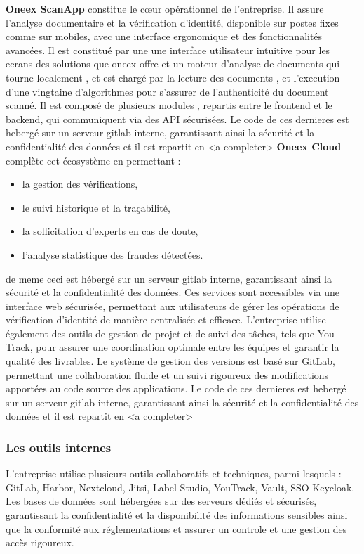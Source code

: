 \textbf{Oneex ScanApp} constitue le cœur opérationnel de l’entreprise. Il assure l’analyse documentaire et la vérification d’identité, disponible sur postes fixes comme sur mobiles, avec une interface ergonomique et des fonctionnalités avancées. Il est constitué par une une interface utilisateur intuitive pour les ecrans des solutions que oneex offre et un moteur d’analyse de documents qui tourne localement , et est chargé par la lecture des documents , et l'execution d'une vingtaine d'algorithmes pour s'assurer de l'authenticité du document scanné.
Il est composé de plusieurs modules , repartis entre le frontend et le backend, qui communiquent via des API sécurisées.
Le code de ces dernieres est hebergé sur un serveur gitlab interne, garantissant ainsi la sécurité et la confidentialité des données et il est repartit en
<a completer>
\textbf{Oneex Cloud} complète cet écosystème en permettant :

\begin{itemize}
	\item la gestion des vérifications,
	\item le suivi historique et la traçabilité,
	\item la sollicitation d’experts en cas de doute,
	\item l’analyse statistique des fraudes détectées.
\end{itemize}
de meme ceci est hébergé sur un serveur gitlab interne, garantissant ainsi la sécurité et la confidentialité des données.
Ces services sont accessibles via une interface web sécurisée, permettant aux utilisateurs de gérer les opérations de vérification d’identité de manière centralisée et efficace.
L’entreprise utilise également des outils de gestion de projet et de suivi des tâches, tels que You
Track, pour assurer une coordination optimale entre les équipes et garantir la qualité des livrables.
Le système de gestion des versions est basé sur GitLab, permettant une collaboration fluide et un
suivi rigoureux des modifications apportées au code source des applications.
Le code de ces dernieres est hebergé sur un serveur gitlab interne, garantissant ainsi la sécurité et la confidentialité des données et il est repartit en
<a completer>

\subsubsection{Les outils internes}

L’entreprise utilise plusieurs outils collaboratifs et techniques, parmi lesquels :
GitLab, Harbor, Nextcloud, Jitsi, Label Studio, YouTrack, Vault, SSO Keycloak.
Les bases de données sont hébergées sur des serveurs dédiés et sécurisés, garantissant la confidentialité et la disponibilité des informations sensibles ainsi que la conformité aux réglementations et assurer un controle et une gestion des accès rigoureux.

